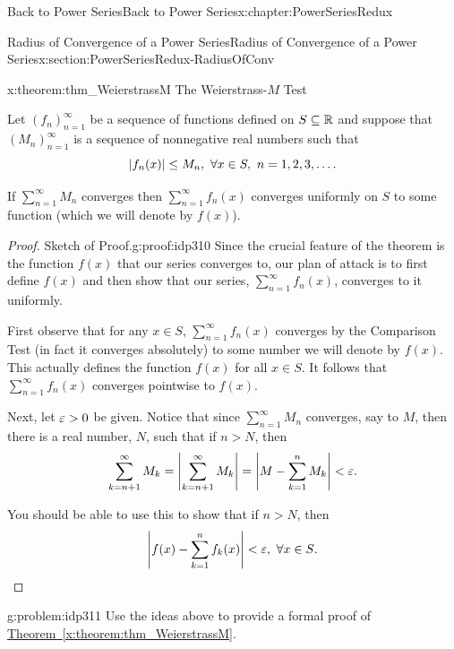 \begin{chapterptx}{Back to Power Series}{}{Back to Power Series}{}{}{x:chapter:PowerSeriesRedux}
\begin{sectionptx}{Radius of Convergence of a Power Series}{}{Radius of Convergence of a Power Series}{}{}{x:section:PowerSeriesRedux-RadiusOfConv}
		\begin{theorem}{}{}{x:theorem:thm_WeierstrassM}%
			\alert{The Weierstrass-\(M\) Test}%
			\par
			 Let \(\left(f_n\right)_{n=1}^\infty\) be a sequence of functions defined on \(S\subseteq\mathbb {R}\) and suppose that \(\left(M_n\right)_{n=1}^\infty\) is a sequence of nonnegative real numbers such that%
			\begin{equation*}
				\left|f_n(x)\right|\leq M_n,\,\, \forall x\in S,\,\, n=1, 2, 3, \ldots\text{.}
			\end{equation*}
			\par
			If \(\sum_{n=1}^\infty M_n\) converges then \(\sum_{n=1}^\infty f_n(x)\) converges uniformly on \(S\) to some function (which we will denote by \(f(x)\)).%
		\end{theorem}
		\begin{proof}{Sketch of Proof.}{g:proof:idp310}
			Since the crucial feature of the theorem is the function \(f(x)\) that our series converges to, our plan of attack is to first define \(f(x)\) and then show that our series, \(\sum_{n=1}^\infty f_n(x)\), converges to it uniformly.%
			\par
			First observe that for any \(x\in S\), \(\sum_{n=1}^\infty f_n(x)\) converges by the Comparison Test (in fact it converges absolutely) to some number we will denote by \(f(x)\). This actually defines the function \(f(x)\) for all \(x\in S\). It follows that \(\sum_{n=1}^\infty f_n(x)\) converges pointwise to \(f(x)\).%
			\par
			Next, let \(\varepsilon>0\) be given. Notice that since \(\sum_{n=1}^\infty M_n\) converges, say to \(M\), then there is a real number, \(N\), such that if \(n>N\), then%
			\begin{equation*}
				\sum_{k=n+1}^\infty M_k = \left|\sum_{k=n+1}^\infty M_k\right| = \left|M-\sum_{k=1}^n M_k\right|< \varepsilon\text{.}
			\end{equation*}
			\par
			You should be able to use this to show that if \(n>N\), then%
			\begin{equation*}
				\left|f(x) - \sum_{k=1}^n f_k(x)\right|<  \varepsilon, \, \, \forall x\in S\text{.}\relax
			\end{equation*}
		\end{proof}
		\begin{problem}{}{g:problem:idp311}%
			 Use the ideas above to provide a formal proof of \hyperref[x:theorem:thm_WeierstrassM]{Theorem~{\xreffont\ref{x:theorem:thm_WeierstrassM}}}.%

\end{problem}
\end{sectionptx}
\end{chapterptx}
